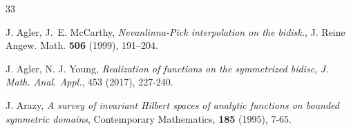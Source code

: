 \documentclass[12pt,reqno]{amsart}
\theoremstyle{remark}
\theoremstyle{definition}
\begin{document}
\begin{thebibliography}{33}



 J. Agler, J.~E. McCarthy, \emph{Nevanlinna-Pick interpolation on the bidisk.}, J. Reine Angew. Math. {\bf 506} (1999), 191–204.


 J. Agler, N. J. Young, \emph{Realization of functions on the symmetrized bidisc}, \textit{J. Math. Anal. Appl.}, {453} (2017), 227-240.

J. Arazy, \emph{A survey of invariant {H}ilbert spaces of analytic functions on bounded symmetric domains}, Contemporary Mathematics, {\bf 185}  (1995), 7-65.








\end{thebibliography}
\end{document}
